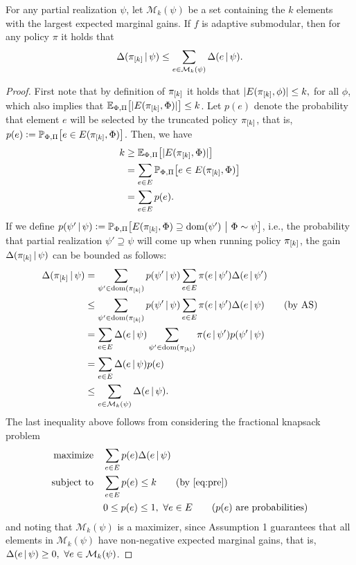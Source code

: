 \begin{lemma}\label{lem:mon_subm}
  For any partial realization $\psi$, let $\mathcal{M}_k(\psi)$ be a set containing the $k$ elements with the largest expected marginal gains.
  If $f$ is adaptive submodular, then for any policy $\pi$ it holds that
  \begin{align*}
    \Delta(\pi_{[k]}\,\vert\,\psi) \leq \sum_{e \in \mathcal{M}_k(\psi)} \Delta(e\,\vert\,\psi).
  \end{align*}
\end{lemma}
\begin{proof}
  First note that by definition of $\pi_{[k]}$ it holds that $|E(\pi_{[k]}, \phi)| \leq k,$ for all $\phi$, which also implies that $\E[\Phi,\Pi]{|E(\pik, \Phi)|} \leq k$.
  Let $p(e)$ denote the probability that element $e$ will be selected by the truncated policy $\pi_{[k]}$, that is, $p(e) \defeq \P[\Phi,\Pi]{e \in E(\pik, \Phi)}$.
  Then, we have
  \begin{align}
    \label{eq:pre}
    \begin{split}
      k &\geq \E[\Phi, \Pi]{|E(\pik, \Phi)|}\\
        &= \sum_{e \in E}\P[\Phi,\Pi]{e \in E(\pik, \Phi)}\\
        &= \sum_{e \in E}p(e).
    \end{split}
  \end{align}
  If we define $p(\psi'\mmid\psi) \defeq \P[\Phi,\Pi]{E(\pik, \Phi) \supseteq \dom(\psi')}[\Phi \sim \psi]$, i.e., the probability that partial realization $\psi' \supseteq \psi$ will come up when running policy $\pi_{[k]}$, the gain $\Delta(\pi_{[k]}\,\vert\,\psi)$ can be bounded as follows:
  \begin{align*}
    \Delta(\pi_{[k]}\,\vert\,\psi) &= \sum_{\psi' \in \operatorname{dom}(\pi_{[k]})}p(\psi'\,\vert\,\psi)\sum_{e \in E}\pi(e\,\vert\,\psi')\Delta(e\,\vert\,\psi')\\
    &\leq \sum_{\psi' \in \operatorname{dom}(\pi_{[k]})}p(\psi'\,\vert\,\psi)\sum_{e \in E}\pi(e\,\vert\,\psi')\Delta(e\,\vert\,\psi) \tag*{(by AS)}\\
    &= \sum_{e \in E}\Delta(e\,\vert\,\psi) \sum_{\psi' \in \operatorname{dom}(\pi_{[k]})}\pi(e\,\vert\,\psi')p(\psi'\,\vert\,\psi)\\
    &= \sum_{e \in E}\Delta(e\,\vert\,\psi) p(e)\\
    &\leq \sum_{e \in \mathcal{M}_k(\psi)} \Delta(e\,\vert\,\psi).
  \end{align*}
  The last inequality above follows from considering the fractional knapsack problem
  \begin{align*}
    \textrm{maximize} & \quad \sum_{e \in E}p(e)\D{e}{\psi}\\
    \textrm{subject to} & \quad \sum_{e \in E}p(e) \leq k \tag*{(by \eqref{eq:pre})}\\
               & \quad 0 \leq p(e) \leq 1,\ \forall e \in E \tag*{($p(e)$ are probabilities)}
  \end{align*}
  and noting that $\mathcal{M}_k(\psi)$ is a maximizer, since Assumption 1 guarantees that all elements in  $\mathcal{M}_k(\psi)$ have non-negative expected marginal gains, that is, $\Delta(e\,\vert\,\psi) \geq 0,\ \forall e \in \mathcal{M}_k(\psi)$.
\end{proof}

